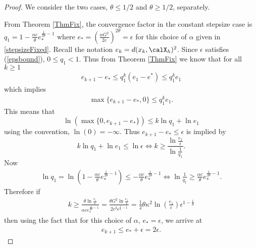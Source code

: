   \begin{proof} We consider the two cases, $\theta\leq1/2$ and $\theta\geq 1/2$, separately.
  
  
  \noindent
  From Theorem \ref{ThmFix}, the convergence factor in the constant stepsize case is $q_1=1-\frac{\alpha c}{\theta} e_*^{\frac{1}{2\theta}-1}$ where $e_*=\left(\frac{\alpha G^2}{2c}\right)^{2\theta}=\epsilon$ for this choice of $\alpha$ given in \eqref{stepsizeFixed}. Recall the notation $e_k=d(x_k,\calX_h)^2$. 
  Since $\epsilon$ satisfies (\ref{epsbound}), $0\leq q_1<1$. 
  Thus from Theorem \ref{ThmFix} we know that for all $k\geq 1$
  \begin{align*}
  e_{k+1} - e_*\leq q_1^k(e_1 - e^*)\leq q_1^k e_1
  \end{align*}
  which implies
  \begin{align}\label{eqNewalign}
  \max\{e_{k+1}-e_*,0\}\leq q_1^k e_1.
  \end{align}
  This means that  
  $$
  \ln(\max\{0,e_{k+1}-e_*\})\leq k\ln q_1 + \ln e_1
  $$
  using the convention, $\ln(0)=-\infty$. 
  Thus $e_{k+1}-e_*\leq\epsilon$ is implied by
  $$
  k\ln q_1 + \ln e_1\leq \ln\epsilon
  \iff k\geq \frac{\ln\frac{e_1}{\epsilon}}{\ln\frac{1}{q_1}}.
  $$
    Now 
  \begin{eqnarray*}
  \ln q_1=\ln\left(1-\frac{\alpha c}{\theta}e_*^{\frac{1}{2\theta}-1}\right)\leq -\frac{\alpha c}{\theta} e_*^{\frac{1}{2\theta}-1}\iff \ln\frac{1}{q_1}\geq \frac{\alpha c}{\theta} e_*^{\frac{1}{2\theta}-1}.
  \end{eqnarray*}
  Therefore if
  \begin{eqnarray*}
  k\geq 
  \frac{\theta\ln\frac{e_1}{\epsilon}}{\alpha c e_*^{\frac{1}{2\theta}-1}}
  =
  \frac{\theta G^2\ln\frac{e_1}{\epsilon}}{2c^2\epsilon^{\frac{1}{\theta}-1}}
  =
  \frac{1}{2}\theta\kappa^2\ln\left(\frac{e_1}{\epsilon}\right)\epsilon^{1-\frac{1}{\theta}}
  \end{eqnarray*}
  then using the fact that for this choice of $\alpha$, $e_*=\epsilon$, we arrive at
  \begin{eqnarray*}
  e_{k+1}\leq e_* +\epsilon = 2\epsilon.
  \end{eqnarray*}
 
  
  
  

\end{proof}
